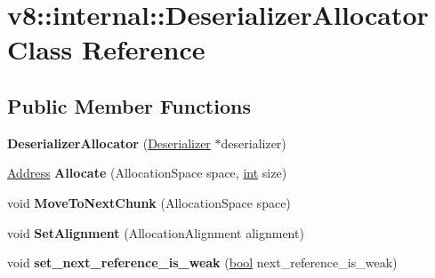 \hypertarget{classv8_1_1internal_1_1DeserializerAllocator}{}\section{v8\+:\+:internal\+:\+:Deserializer\+Allocator Class Reference}
\label{classv8_1_1internal_1_1DeserializerAllocator}
\subsection*{Public Member Functions}
\begin{DoxyCompactItemize}
\item 
\mbox{\label{classv8_1_1internal_1_1DeserializerAllocator_a7739e3512ef1060784744cb370541c97}} 
{\bfseries Deserializer\+Allocator} (\mbox{\hyperlink{classv8_1_1internal_1_1Deserializer}{Deserializer}} $\ast$deserializer)
\item 
\mbox{\label{classv8_1_1internal_1_1DeserializerAllocator_a8fa8008c114bb60bacd00494fd6adf48}} 
\mbox{\hyperlink{classuintptr__t}{Address}} {\bfseries Allocate} (Allocation\+Space space, \mbox{\hyperlink{classint}{int}} size)
\item 
\mbox{\label{classv8_1_1internal_1_1DeserializerAllocator_aa29c087b152769ff5ac2e2409ecb9a81}} 
void {\bfseries Move\+To\+Next\+Chunk} (Allocation\+Space space)
\item 
\mbox{\label{classv8_1_1internal_1_1DeserializerAllocator_aace229d5af1ed5da5b7383be44b30af1}} 
void {\bfseries Set\+Alignment} (Allocation\+Alignment alignment)
\item 
\mbox{\label{classv8_1_1internal_1_1DeserializerAllocator_a98463d751fd92fce440ef84b2427176c}} 
void {\bfseries set\+\_\+next\+\_\+reference\+\_\+is\+\_\+weak} (\mbox{\hyperlink{classbool}{bool}} next\+\_\+reference\+\_\+is\+\_\+weak)
\item 
\mbox{\label{classv8_1_1internal_1_1DeserializerAllocator_a2b30ddcad0e99bfe02aee613629154fd}} 

\end{DoxyCompactItemize}
